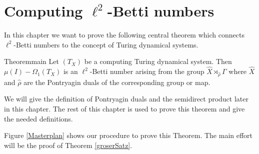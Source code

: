 \documentclass[12pt,a4paper]{scrartcl}
\theoremstyle{plain}
\theoremstyle{definition}
\newcommand{\2}{\mathbb{Z} / 2 \mathbb{Z}}
\newcommand{\1}{\bar{1}}
\newcommand{\0}{\bar{0}}
\begin{document}
\section{Computing $\ell^2$-Betti numbers}
In this chapter we want to prove the following central theorem which connects $\ell^2$-Betti numbers to the concept of Turing dynamical systems.
\begin{restatable}{Theorem}{main} \label{HS}
	Let $(T_X)$ be a computing Turing dynamical system. Then $\mu (I) - \Omega_1(T_X)$ is an $\ell^2$-Betti number arising from the group $\hat{X} \rtimes_{\hat{\rho}} \Gamma$ where $\hat{X}$ and $\hat{\rho}$ are the Pontryagin duals of the corresponding group or map.
\end{restatable}
We will give the definition of Pontryagin duals and the semidirect product later in this chapter. The rest of this chapter is used to prove this theorem and give the needed definitions.

Figure \ref{Masterplan} shows our procedure to prove this Theorem. The main effort will be the proof of Theorem \ref{groserSatz}.
\end{document}
